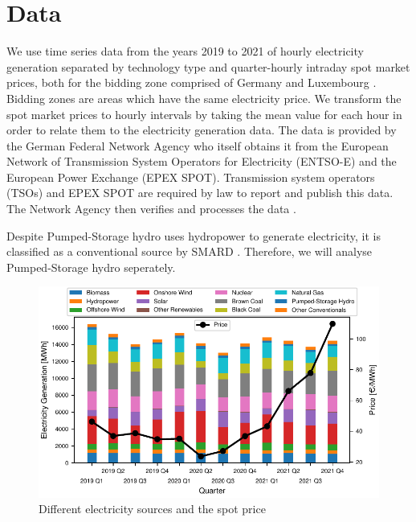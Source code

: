 \documentclass{article}
\begin{document}
\section{Data}
We use time series data from the years 2019 to 2021 of hourly electricity generation separated by technology type and quarter-hourly intraday spot market prices, both for the bidding zone comprised of Germany and Luxembourg \citep{smard}.
Bidding zones are areas which have the same electricity price.
We transform the spot market prices to hourly intervals by taking the mean value for each hour in order to relate them to the electricity generation data.
The data is provided by the German Federal Network Agency who itself obtains it from the European Network of Transmission System Operators for Electricity (ENTSO-E) and the European Power Exchange (EPEX SPOT).
Transmission system operators (TSOs) and EPEX SPOT are required by law to report and publish this data.
The Network Agency then verifies and processes the data \citep{smard_usermanual}.

Despite Pumped-Storage hydro uses hydropower to generate electricity, it is classified as a conventional source by SMARD \citep{smard_usermanual}. Therefore, we will analyse Pumped-Storage hydro seperately.  

\begin{figure}[h]
    \centering
    \includegraphics[width=\columnwidth]{doc/fig/quarterly_technology_mix_with_price.pdf}
    \caption{Different electricity sources and the spot price}
    \label{fig:quarterly_mix}
\end{figure}
\end{document}
